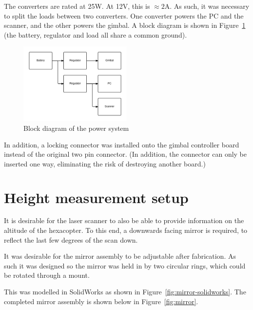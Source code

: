 \documentclass[12pt,oneside,a4paper]{book}
\begin{document}
The converters are rated at 25W. At 12V, this is $\approx 2$A. As
such, it was necessary to split the loads between two converters. One
converter powers the PC and the scanner, and the other powers the
gimbal. A block diagram is shown in Figure~\ref{fig:power} (the
battery, regulator and load all share a common ground).

\begin{figure}[h!]
  \centering
  \includegraphics[width=0.5\textwidth]{figs/power}
  \caption{Block diagram of the power system}
  \label{fig:power}
\end{figure}

In addition, a locking connector was installed onto the gimbal
controller board instead of the original two pin connector. (In
addition, the connector can only be inserted one way, eliminating the
risk of destroying another board.)

\section{Height measurement setup}
\label{sec:height-meas-setup}

It is desirable for the laser scanner to also be able to provide
information on the altitude of the hexacopter. To this end, a
downwards facing mirror is required, to reflect the last few degrees
of the scan down.

It was desirable for the mirror assembly to be adjustable after
fabrication. As such it was designed so the mirror was held in by two
circular rings, which could be rotated through a mount.

This was modelled in SolidWorks as shown in
Figure~\ref{fig:mirror-solidworks}. The completed mirror assembly is shown below in
Figure~\ref{fig:mirror}.
\end{document}
